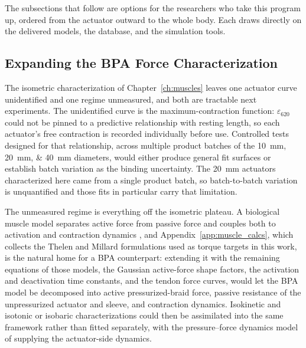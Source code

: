 The subsections that follow are options for the researchers who take this program up, ordered from the actuator outward to the whole body. Each draws directly on the delivered models, the database, and the simulation tools.

\subsection{Expanding the BPA Force Characterization}\label{sec:fw_bpa}

The isometric characterization of Chapter~\ref{ch:muscles} leaves one actuator curve unidentified and one regime unmeasured, and both are tractable next experiments. The unidentified curve is the maximum-contraction function: $\varepsilon_{620}$ could not be pinned to a predictive relationship with resting length, so each actuator's free contraction is recorded individually before use. Controlled tests designed for that relationship, across multiple product batches of the \qtylist{10;20;40}{\mm} diameters, would either produce general fit surfaces or establish batch variation as the binding uncertainty. The \qty{20}{\mm} actuators characterized here came from a single product batch, so batch-to-batch variation is unquantified and those fits in particular carry that limitation.

The unmeasured regime is everything off the isometric plateau. A biological muscle model separates active force from passive force and couples both to activation and contraction dynamics \citep{thelen_adjustment_2003, millard_flexing_2013}, and Appendix~\ref{app:muscle_calcs}, which collects the Thelen and Millard formulations used as torque targets in this work, is the natural home for a BPA counterpart: extending it with the remaining equations of those models, the Gaussian active-force shape factors, the activation and deactivation time constants, and the tendon force curves, would let the BPA model be decomposed into active pressurized-braid force, passive resistance of the unpressurized actuator and sleeve, and contraction dynamics. Isokinetic and isotonic or isobaric characterizations could then be assimilated into the same framework rather than fitted separately, with the pressure--force dynamics model of \citet{elzein_pressure_2025} supplying the actuator-side dynamics.

